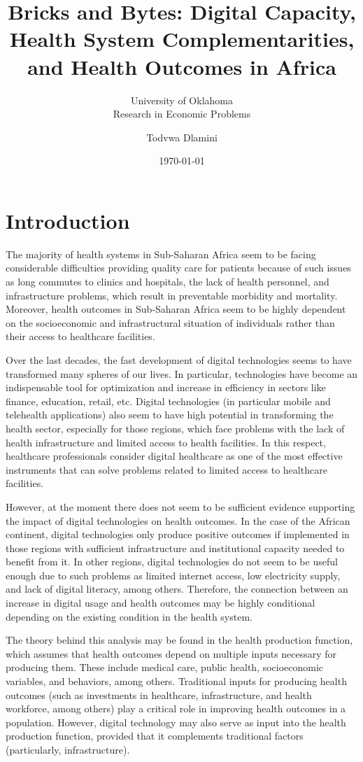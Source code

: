 \documentclass[12pt]{article}
\title{Bricks and Bytes: Digital Capacity, Health System Complementarities, and Health Outcomes in Africa}
\subtitle{University of Oklahoma\\Research in Economic Problems}
\author{Todvwa Dlamini}
\date{\today}
\begin{document}
\maketitle



\newpage
{} 
 

\section{Introduction}
The majority of health systems in Sub-Saharan Africa seem to be facing considerable difficulties providing quality care for patients because of such issues as long commutes to clinics and hospitals, the lack of health personnel, and infrastructure problems, which result in preventable morbidity and mortality. Moreover, health outcomes in Sub-Saharan Africa seem to be highly dependent on the socioeconomic and infrastructural situation of individuals rather than their access to healthcare facilities.

\medskip
Over the last decades, the fast development of digital technologies seems to have transformed many spheres of our lives. In particular, technologies have become an indispensable tool for optimization and increase in efficiency in sectors like finance, education, retail, etc. Digital technologies (in particular mobile and telehealth applications) also seem to have high potential in transforming the health sector, especially for those regions, which face problems with the lack of health infrastructure and limited access to health facilities. In this respect, healthcare professionals consider digital healthcare as one of the most effective instruments that can solve problems related to limited access to healthcare facilities.

\medskip
However, at the moment there does not seem to be sufficient evidence supporting the impact of digital technologies on health outcomes. In the case of the African continent, digital technologies only produce positive outcomes if implemented in those regions with sufficient infrastructure and institutional capacity needed to benefit from it. In other regions, digital technologies do not seem to be useful enough due to such problems as limited internet access, low electricity supply, and lack of digital literacy, among others. Therefore, the connection between an increase in digital usage and health outcomes may be highly conditional depending on the existing condition in the health system.

\medskip
The theory behind this analysis may be found in the health production function, which assumes that health outcomes depend on multiple inputs necessary for producing them. These include medical care, public health, socioeconomic variables, and behaviors, among others. Traditional inputs for producing health outcomes (such as investments in healthcare, infrastructure, and health workforce, among others) play a critical role in improving health outcomes in a population. However, digital technology may also serve as input into the health production function, provided that it complements traditional factors (particularly, infrastructure).
\end{document}
